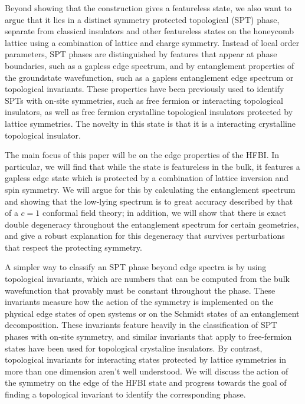 Beyond showing that the construction gives a featureless state, we also want 
to argue that it lies in a distinct symmetry protected topological (SPT) 
phase, separate from classical insulators and other featureless states on the 
honeycomb lattice using a combination of lattice and charge symmetry. Instead 
of local order parameters, SPT phases are distinguished by features that 
appear at phase boundaries, such as a gapless edge spectrum, and by 
entanglement 
properties of the groundstate wavefunction, such as a gapless entanglement edge spectrum or topological invariants. These properties have 
been previously used to identify SPTs with on-site symmetries, such as free 
fermion or interacting topological insulators, as well as free fermion 
crystalline topological insulators protected by lattice symmetries. 
The novelty in this state is that it is a interacting crystalline topological insulator.

The main focus of this paper will be on the edge properties of the HFBI.
In particular, we will find that while the state is featureless in the bulk, it
features a gapless edge state which is protected by a combination of lattice 
inversion
and spin symmetry. We will argue for this by calculating the entanglement 
spectrum and showing
that the low-lying spectrum is to great accuracy described by that of a $c=1$
conformal field theory; in addition, we will show that there is exact double 
degeneracy throughout the entanglement spectrum for certain geometries, and 
give a robust explanation for this degeneracy that survives perturbations that 
respect the protecting symmetry.

A simpler way to classify an SPT phase beyond edge spectra is by using 
topological invariants, which are numbers that can be computed from the bulk 
wavefunction that provably must be constant throughout the phase. These 
invariants measure how the action of the symmetry is implemented on the 
physical edge states of open systems or on the Schmidt states of an 
entanglement decomposition. These invariants feature heavily in the 
classification of SPT phases with on-site symmetry, and similar invariants 
that apply to free-fermion states have been used for topological crystaline 
insulators. By contrast, topological invariants for interacting states 
protected by lattice symmetries in more than one dimension aren't well 
understood. We will discuss the action of the symmetry on the edge of the HFBI 
state and progress towards the goal of finding a topological invariant to 
identify the corresponding phase.


